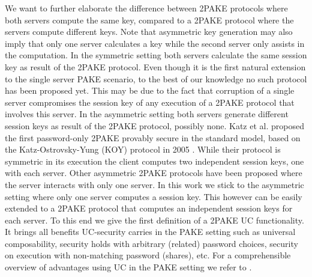 We want to further elaborate the difference between 2PAKE protocols where both servers compute the same key, compared to a 2PAKE protocol where the servers compute different keys.
Note that asymmetric key generation may also imply that only one server calculates a key while the second server only assists in the computation.
In the symmetric setting both servers calculate the same session key as result of the 2PAKE protocol.
Even though it is the first natural extension to the single server PAKE scenario, to the best of our knowledge no such protocol has been proposed yet.
This may be due to the fact that corruption of a single server compromises the session key of any execution of a 2PAKE protocol that involves this server.
In the asymmetric setting both servers generate different session keys as result of the 2PAKE protocol, possibly none.
Katz et al. proposed the first password-only 2PAKE provably secure in the standard model, based on the Katz-Ostrovsky-Yung (KOY) protocol \cite{Katz_Ostrovsky_Yung_2001} in 2005 \cite{KatzMTB05}.
While their protocol is symmetric in its execution the client computes two independent session keys, one with each server.
Other asymmetric 2PAKE protocols have been proposed \cite{Yang_Deng_Bao_2006,Jin_Wong_Xu_2007} where the server interacts with only one server.
In this work we stick to the asymmetric setting where only one server computes a session key.
This however can be easily extended to a 2PAKE protocol that computes an independent session keys for each server.
To this end we give the first definition of a 2PAKE UC functionality.
It brings all benefits UC-security carries in the PAKE setting such as universal composability, security holds with arbitrary (related) password choices, security on execution with non-matching password (shares), etc.
For a comprehensible overview of advantages using UC in the PAKE setting we refer to \cite{Canetti2005}.


